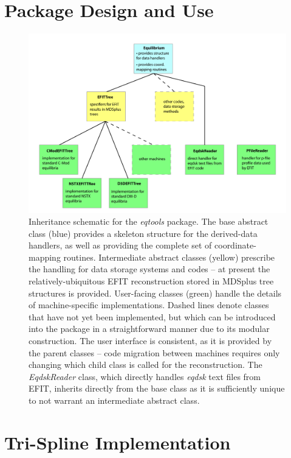 \documentclass[12pt,floatfix,showpacs]{revtex4-1}
\begin{document}
\section{Package Design and Use}\label{sec:design}

\begin{figure}[p]
 \includegraphics[width=\textwidth]{graphics/flowchart.pdf}
 \caption{Inheritance schematic for the \emph{eqtools} package.  The base abstract class (blue) provides a skeleton structure for the derived-data handlers, as well as providing the complete set of coordinate-mapping routines.  Intermediate abstract classes (yellow) prescribe the handling for data storage systems and codes -- at present the relatively-ubiquitous EFIT reconstruction stored in MDSplus tree structures is provided.  User-facing classes (green) handle the details of machine-specific implementations.  Dashed lines denote classes that have not yet been implemented, but which can be introduced into the package in a straightforward manner due to its modular construction.  The user interface is consistent, as it is provided by the parent classes -- code migration between machines requires only changing which child class is called for the reconstruction.  The \emph{EqdskReader} class, which directly handles \emph{eqdsk} text files from EFIT, inherits directly from the base class as it is sufficiently unique to not warrant an intermediate abstract class.}
 \label{fig:flowchart}
\end{figure}

\section{Tri-Spline Implementation}\label{sec:trispline}
\end{document}
